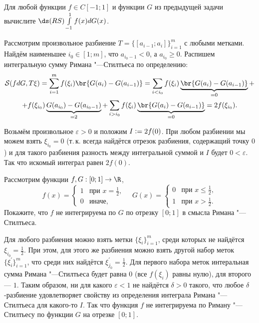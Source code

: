 \begin{problem}[31$^\circ$]
    Для любой функции $f \in C[-1; 1]$ и функции $G$ из предыдущей задачи вычислите $\ds(RS)\int\limits_{-1}^1f(x)dG(x)$.
\end{problem}

\begin{solution}
    Рассмотрим произвольное разбиение $T = \{[a_{i - 1}; a_i]\}_{i = 1}^m$ с любыми метками. Найдём наименьшее $i_0 \in [1; m]$, что $a_{i_0 - 1} < 0$, а $a_{i_0} \geqslant 0$. Распишем интегральную сумму Римана "---Стилтьеса по определению:
    \begin{multline*}
        \mathcal{S}(fdG, T\xi) = \sum_{i = 1}^mf(\xi_i)\br{G(a_i) - G(a_{i - 1})} = \sum_{i < i_0}f(\xi_i)\underbrace{\br{G(a_i) - G(a_{i - 1})}}_{= 0} +\\ + f(\xi_{i_0})\underbrace{G(a_{i_0}) - G(a_{i_0 - 1})}_{= 2} + \sum_{i > i_0}f(\xi_i)\underbrace{\br{G(a_i) - G(a_{i - 1})}}_{= 0} = 2f(\xi_{i_0}).
    \end{multline*}

    Возьмём произвольное $\varepsilon > 0$ и положим $I \vcentcolon = 2f(0)$. При любом разбиении мы можем взять $\xi_{i_0} = 0$ (т.\,к. всегда найдётся отрезок разбиения, содержащий точку $0$) и для такого разбиения разность между интегральной суммой и $I$ будет $0 < \varepsilon$. Так что искомый интеграл равен $2f(0)$.
\end{solution}

\begin{problem}[32$^\circ$]
    Рассмотрим функции $f, G: [0; 1] \to \R$,
    \[
        f(x) =
        \begin{cases}
            1 & \text{при $x = \frac{1}{2}$},\\
            0 & \text{иначе},
        \end{cases}\quad
        G(x) =
        \begin{cases}
            0 & \text{при $x \leqslant \frac{1}{2}$},\\
            1 & \text{при $x > \frac{1}{2}$}.
        \end{cases}
    \]
    Покажите, что $f$ не интегрируема по $G$ по отрезку $[0; 1]$ в смысла Римана "---Стилтьеса.
\end{problem}

\begin{solution}
    Для любого разбиения можно взять метки $\{\xi_i\}_{i = 1}^m$, среди которых не найдётся $\xi_{i_0} = \frac{1}{2}$. При этом, для этого же разбиения можно взять другой набор меток $\{\xi^\prime_i\}_{i = 1}^m$, что среди них найдётся $\xi^\prime_{j_0} = \frac{1}{2}$. Для первого набора меток интеральная сумма Римана "---Стилтьеса будет равна $0$ (все $f(\xi_i)$ равны нулю), для второго --- $1$. Таким образом, ни для какого $\varepsilon < 1$ не найдётся $\delta > 0$ такого, что любое $\delta$-разбиение удовлетворяет свойству из определения интеграла Римана "---Стилтьеса для какого-то $I$. Так что функция $f$ не интегрируема по Риману "---Стилтьесу по функции $G$ на отрезке $[0; 1]$.
\end{solution}

